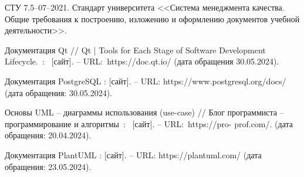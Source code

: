\begin{thebibliography}{0}

    СТУ 7.5–07–2021. 
    Стандарт университета <<Система менеджмента качества. 
    Общие требования к построению, изложению и оформлению 
    документов учебной деятельности>>. 

    Документация Qt 
    // Qt | Tools for Each Stage of Software Development Lifecycle.~:~
    [сайт].  – URL:~https://doc.qt.io/ 
    (дата обращения 30.05.2024). 

    Документация PostgreSQL : 
    [сайт]. – URL: https://www.postgresql.org/docs/
    (дата обращения: 30.05.2024).

    Основы UML – диаграммы использования (use-case) 
    // Блог программиста – программирование и алгоритмы~:~
    [сайт]. – URL:~https://pro- prof.com/. 
    (дата обращения: 20.04.2024). 

    Документация PlantUML : 
    [сайт]. – URL: https://plantuml.com/
    (дата обращения: 23.05.2024).

\end{thebibliography}
